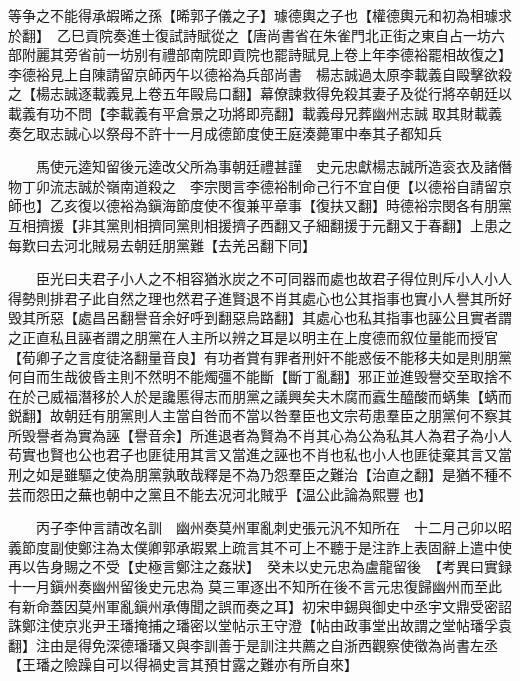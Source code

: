 等争之不能得承嘏晞之孫【晞郭子儀之子】璩德輿之子也【權德輿元和初為相璩求於翻】　乙巳貢院奏進士復試詩賦從之【唐尚書省在朱雀門北正街之東自占一坊六部附麗其旁省前一坊别有禮部南院即貢院也罷詩賦見上卷上年李德裕罷相故復之】　李德裕見上自陳請留京師丙午以德裕為兵部尚書　楊志誠過太原李載義自毆擊欲殺之【楊志誠逐載義見上卷五年毆烏口翻】幕僚諫救得免殺其妻子及從行將卒朝廷以載義有功不問【李載義有平倉景之功將即亮翻】載義母兄葬幽州志誠取其財載義奏乞取志誠心以祭母不許十一月成德節度使王庭湊薨軍中奉其子都知兵

　　馬使元逵知留後元逵改父所為事朝廷禮甚謹　史元忠獻楊志誠所造衮衣及諸僭物丁卯流志誠於嶺南道殺之　李宗閔言李德裕制命己行不宜自便【以德裕自請留京師也】乙亥復以德裕為鎭海節度使不復兼平章事【復扶又翻】時德裕宗閔各有朋黨互相擠援【非其黨則相擠同黨則相援擠子西翻又子細翻援于元翻又于春翻】上患之每歎曰去河北賊易去朝廷朋黨難【去羌呂翻下同】

　　臣光曰夫君子小人之不相容猶氷炭之不可同器而處也故君子得位則斥小人小人得勢則排君子此自然之理也然君子進賢退不肖其處心也公其指事也實小人譽其所好毁其所惡【處昌呂翻譽音余好呼到翻惡烏路翻】其處心也私其指事也誣公且實者謂之正直私且誣者謂之朋黨在人主所以辨之耳是以明主在上度德而叙位量能而授官【荀卿子之言度徒洛翻量音良】有功者賞有罪者刑奸不能惑佞不能移夫如是則朋黨何自而生哉彼昏主則不然明不能燭彊不能斷【斷丁亂翻】邪正並進毁譽交至取捨不在於己威福潛移於人於是讒慝得志而朋黨之議興矣夫木腐而蠧生醯酸而蜹集【蜹而鋭翻】故朝廷有朋黨則人主當自咎而不當以咎羣臣也文宗苟患羣臣之朋黨何不察其所毁譽者為實為誣【譽音余】所進退者為賢為不肖其心為公為私其人為君子為小人苟實也賢也公也君子也匪徒用其言又當進之誣也不肖也私也小人也匪徒棄其言又當刑之如是雖驅之使為朋黨孰敢哉釋是不為乃怨羣臣之難治【治直之翻】是猶不種不芸而怨田之蕪也朝中之黨且不能去况河北賊乎【温公此論為熙豐也】

　　丙子李仲言請改名訓　幽州奏莫州軍亂刺史張元汎不知所在　十二月己卯以昭義節度副使鄭注為太僕卿郭承嘏累上疏言其不可上不聽于是注詐上表固辭上遣中使再以告身賜之不受【史極言鄭注之姦狀】　癸未以史元忠為盧龍留後　【考異曰實録十一月鎭州奏幽州留後史元忠為莫三軍逐出不知所在後不言元忠復歸幽州而至此有新命蓋因莫州軍亂鎭州承傳聞之誤而奏之耳】初宋申錫與御史中丞宇文鼎受密詔誅鄭注使京兆尹王璠掩捕之璠密以堂帖示王守澄【帖由政事堂出故謂之堂帖璠孚袁翻】注由是得免深德璠璠又與李訓善于是訓注共薦之自浙西觀察使徵為尚書左丞【王璠之險躁自可以得禍史言其預甘露之難亦有所自來】

